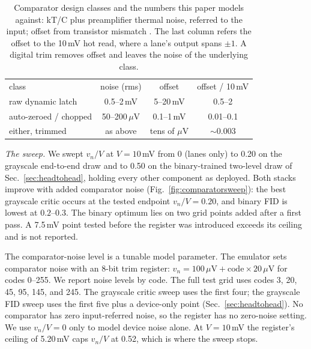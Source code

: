 \documentclass[reprint,amsmath,amssymb,aps,nofootinbib]{revtex4-2}
\begin{document}
\begin{table}
\caption{Comparator design classes and the numbers this paper models
against: kT/C plus preamplifier thermal noise, referred to the input;
offset from transistor mismatch \cite{pelgrom1989matching}. The last
column refers the offset to the 10\,mV hot read, where a lane's
output spans $\pm 1$. A digital trim removes offset and leaves the
noise of the underlying class.
\label{tab:comparator}}
\begin{ruledtabular}
\footnotesize
\begin{tabular}{lccc}
class & noise (rms) & offset & offset / 10\,mV \\
\colrule
raw dynamic latch & 0.5--2\,mV & 5--20\,mV & 0.5--2 \\
auto-zeroed / chopped & 50--200\,$\mu$V & 0.1--1\,mV & 0.01--0.1 \\
either, trimmed & as above & tens of $\mu$V & $\sim 0.003$ \\
\end{tabular}
\end{ruledtabular}
\end{table}

\emph{The sweep.} We swept $v_n / V$ at $V = 10$\,mV from 0 (lanes
only) to 0.20 on the grayscale end-to-end draw and to 0.50 on the
binary-trained two-level draw of Sec.~\ref{sec:headtohead}, holding
every other component as deployed. Both stacks improve with added comparator noise (Fig.~\ref{fig:comparatorsweep}): the best grayscale critic occurs at the tested endpoint $v_n / V=0.20$, and binary FID is lowest at $0.2$--$0.3$. The binary optimum lies on two grid points added after a first pass. A 7.5\,mV point tested before the register was introduced exceeds its ceiling and is not reported.

The comparator-noise level is a tunable model parameter. The emulator sets comparator noise with an 8-bit trim register: $v_n =
100\,\mu\mathrm{V} + \mathrm{code} \times 20\,\mu\mathrm{V}$ for codes
0--255. We report noise levels by code. The full test grid uses codes 3,
20, 45, 95, 145, and 245. The grayscale critic sweep uses the first
four; the grayscale FID sweep uses the first five plus a device-only
point (Sec.~\ref{sec:headtohead}). No comparator has zero input-referred noise, so the register has no
zero-noise setting. We use $v_n / V = 0$ only to model device noise
alone. At $V = 10$\,mV
the register's ceiling of 5.20\,mV caps $v_n / V$ at 0.52, which is
where the sweep stops.
\end{document}
